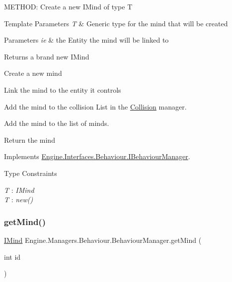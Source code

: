 M\+E\+T\+H\+OD\+: Create a new I\+Mind of type T 


\begin{DoxyTemplParams}{Template Parameters}
{\em T} & Generic type for the mind that will be created\\
\hline
\end{DoxyTemplParams}

\begin{DoxyParams}{Parameters}
{\em ie} & the Entity the mind will be linked to\\
\hline
\end{DoxyParams}
\begin{DoxyReturn}{Returns}
a brand new I\+Mind
\end{DoxyReturn}
Create a new mind

Link the mind to the entity it controls

Add the mind to the collision List in the \hyperlink{a00268}{Collision} manager.

Add the mind to the list of minds.

Return the mind 

Implements \hyperlink{a00418_ad821620edeb0239197446bf1c3c32ee3}{Engine.\+Interfaces.\+Behaviour.\+I\+Behaviour\+Manager}.

\begin{Desc}
\item[Type Constraints]\begin{description}
\item[{\em T} : {\em I\+Mind}]\item[{\em T} : {\em new()}]\end{description}
\end{Desc}
\mbox{\label{a00486_a4391a84eadd13a812977cd51e177e00b}} 
\subsubsection{\texorpdfstring{get\+Mind()}{getMind()}}
{\footnotesize\ttfamily \hyperlink{a00446}{I\+Mind} Engine.\+Managers.\+Behaviour.\+Behaviour\+Manager.\+get\+Mind (\begin{DoxyParamCaption}\item[{int}]{id }\end{DoxyParamCaption})\hspace{0.3cm}{\ttfamily [inline]}}



